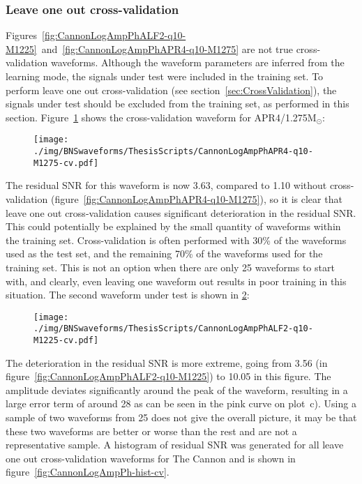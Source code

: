 \subsubsection{Leave one out cross-validation}
\label{sec:TheCannonLOOCV}
Figures~\ref{fig:CannonLogAmpPhALF2-q10-M1225}~and~\ref{fig:CannonLogAmpPhAPR4-q10-M1275} are not true cross-validation waveforms. Although the waveform parameters are inferred from the learning mode, the signals under test were included in the training set. To perform leave one out cross-validation (see section~\ref{sec:CrossValidation}), the signals under test should be excluded from the training set, as performed in this section. Figure~\ref{fig:CannonLogAmpPhAPR4-q10-M1275-cv} shows the cross-validation waveform for APR4/1.275M$_\odot$:
\begin{figure}[H]
	\texttt{[image: ./img/BNSwaveforms/ThesisScripts/CannonLogAmpPhAPR4-q10-M1275-cv.pdf]} 
	\caption[\protect]{\protect}
	\label{fig:CannonLogAmpPhAPR4-q10-M1275-cv}
\end{figure}
The residual SNR for this waveform is now 3.63, compared to 1.10 without cross-validation (figure~\ref{fig:CannonLogAmpPhAPR4-q10-M1275}), so it is clear that leave one out cross-validation causes significant deterioration in the residual SNR. This could potentially be explained by the small quantity of waveforms within the training set. Cross-validation is often performed with 30\% of the waveforms used as the test set, and the remaining 70\% of the waveforms used for the training set. This is not an option when there are only 25 waveforms to start with, and clearly, even leaving one waveform out results in poor training in this situation. The second waveform under test is shown in \ref{fig:CannonLogAmpPhALF2-q10-M1225-cv}:
\begin{figure}[H]
	\texttt{[image: ./img/BNSwaveforms/ThesisScripts/CannonLogAmpPhALF2-q10-M1225-cv.pdf]} 
	\caption[\protect]{\protect}
	\label{fig:CannonLogAmpPhALF2-q10-M1225-cv}
\end{figure}
The deterioration in the residual SNR is more extreme, going from 3.56 (in figure~\ref{fig:CannonLogAmpPhALF2-q10-M1225}) to 10.05 in this figure. The amplitude deviates significantly around the peak of the waveform, resulting in a large error term of around 28 as can be seen in the pink curve on plot~c). Using a sample of two waveforms from 25 does not give the overall picture, it may be that these two waveforms are better or worse than the rest and are not a representative sample. A histogram of residual SNR was generated for all leave one out cross-validation waveforms for The Cannon and is shown in figure~\ref{fig:CannonLogAmpPh-hist-cv}.  
